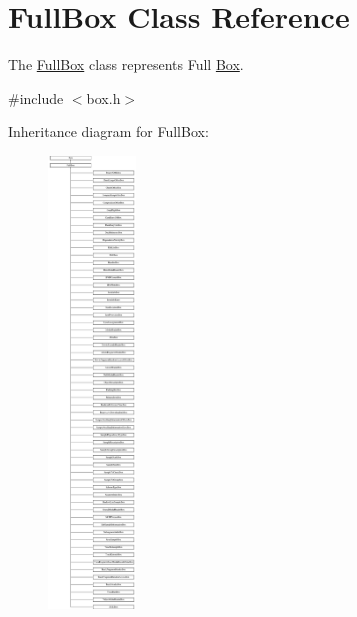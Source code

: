 \hypertarget{class_full_box}{\section{Full\-Box Class Reference}
\label{class_full_box}
}


The \hyperlink{class_full_box}{Full\-Box} class represents Full \hyperlink{class_box}{Box}.  




{\ttfamily \#include $<$box.\-h$>$}

Inheritance diagram for Full\-Box\-:\begin{figure}[H]
\begin{center}
\leavevmode
\includegraphics[height=12.000000cm]{class_full_box}
\end{center}
\end{figure}
